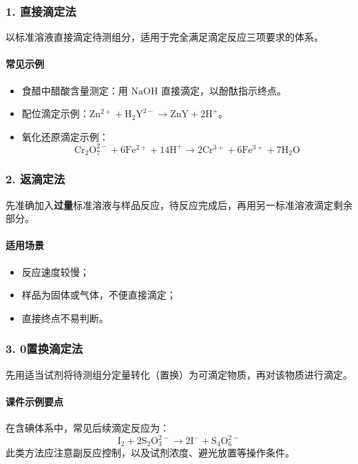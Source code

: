 \documentclass[12pt,a4paper]{article}
\numberwithin{equation}{section}
\begin{document}
\subsubsection{1. 直接滴定法}
以标准溶液直接滴定待测组分，适用于完全满足滴定反应三项要求的体系。

\paragraph{常见示例}
\begin{itemize}
    \item 食醋中醋酸含量测定：用 $\mathrm{NaOH}$ 直接滴定，以酚酞指示终点。
    \item 配位滴定示例：$\mathrm{Zn^{2+}}+\mathrm{H_2Y^{2-}}\rightarrow \mathrm{ZnY}+2\mathrm{H^+}$。
    \item 氧化还原滴定示例：
\begin{equation}
    \mathrm{Cr_2O_7^{2-}}+6\mathrm{Fe^{2+}}+14\mathrm{H^+}
    \rightarrow 2\mathrm{Cr^{3+}}+6\mathrm{Fe^{3+}}+7\mathrm{H_2O}
\end{equation}
\end{itemize}

\subsubsection{2. 返滴定法}
先准确加入\textbf{过量}标准溶液与样品反应，待反应完成后，再用另一标准溶液滴定剩余部分。

\paragraph{适用场景}
\begin{itemize}
    \item 反应速度较慢；
    \item 样品为固体或气体，不便直接滴定；
    \item 直接终点不易判断。
\end{itemize}

\subsubsection{3. 0置换滴定法}
先用适当试剂将待测组分定量转化（置换）为可滴定物质，再对该物质进行滴定。

\paragraph{课件示例要点}
在含碘体系中，常见后续滴定反应为：
\begin{equation}
\mathrm{I_2}+2\mathrm{S_2O_3^{2-}}\rightarrow 2\mathrm{I^-}+\mathrm{S_4O_6^{2-}}
\end{equation}
此类方法应注意副反应控制，以及试剂浓度、避光放置等操作条件。
\end{document}
